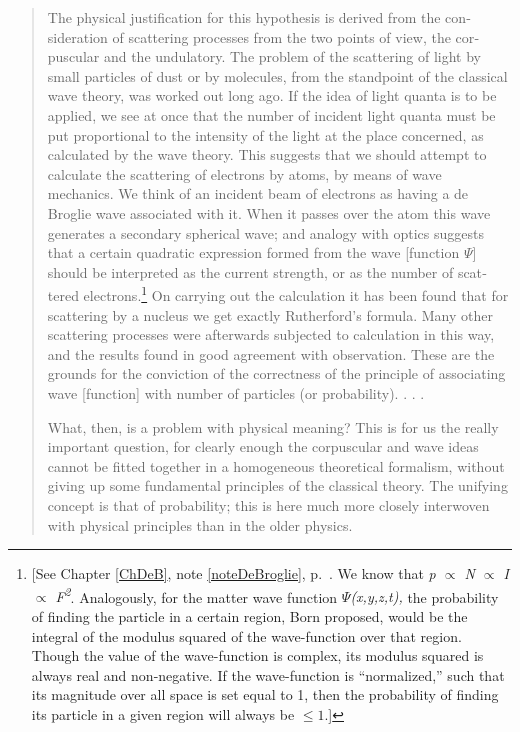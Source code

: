 \begin{quotation}
The physical justification for this hypothesis is derived from the
con­sideration of scattering processes from the two points of view, the
cor­pus\-cular and the undulatory. The problem of the scattering of light
by small particles of dust or by molecules, from the standpoint of the
classical wave theory, was worked out long ago. If the idea of light
quanta is to be applied, we see at once that the number of incident
light quanta must be put proportional to the intensity of the light at
the place concerned, as calculated by the wave theory. This suggests
that we should attempt to calculate the scattering of electrons by
atoms, by means of wave mechanics. We think of an incident beam of
electrons as having a de Broglie wave associated with it. When it passes
over the atom this wave generates a secondary spherical wave; and
analogy with optics sug­gests that a certain quadratic expression formed
from the wave {[}function $\Psi${]} should be interpreted as the
current strength, or as the number of scat­tered electrons.\footnote{{[}See Chapter \ref{ChDeB}, note \ref{noteDeBroglie}, p.~\pageref{noteDeBroglie}.
  We know that \emph{p $\propto$ N $\propto$ I $\propto$ F\textsuperscript{2}}.
  Analogously, for the matter wave function \emph{$\Psi$(x,y,z,t),} the
  probability of finding the particle in a certain region, Born proposed,
  would be the integral of the modulus squared of
  the wave-function over that region. Though the value of the wave-function
  is complex, its modulus squared is always real and non-negative. If
  the wave-function is ``normalized,'' such that its magnitude over all
  space is set equal to 1, then the probability of finding its particle
  in a given region will always be $\leq 1$.{]}} On carrying out the calculation it
has been found that for scattering by a nucleus we get exactly
Rutherford's formula. Many other scattering processes were afterwards
subjected to calculation in this way, and the results found in good
agreement with observation. These are the grounds for the conviction of
the correctness of the principle of associating wave {[}function{]} with
number of particles (or probability). . . .

What, then, is a problem with physical meaning? This is for us the
really important question, for clearly enough the corpuscular and wave
ideas cannot be fitted together in a homogeneous theoretical formalism,
without giving up some funda­mental principles of the classical theory.
The unifying concept is that of probability; this is here much more
closely interwoven with physical principles than in the older physics.
\end{quotation}

